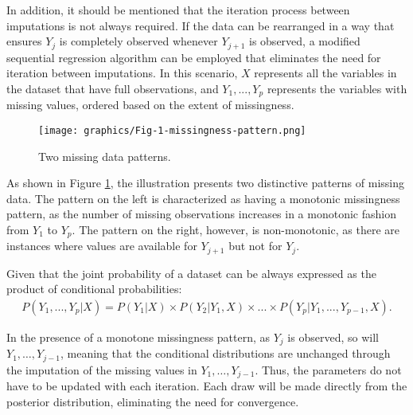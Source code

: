 In addition, it should be mentioned that the iteration process between imputations is not always required. If the data can be rearranged in a way that ensures $Y_j$ is completely observed whenever $Y_{j+1}$ is observed, a modified sequential regression algorithm can be employed that eliminates the need for iteration between imputations. In this scenario, $X$ represents all the variables in the dataset that have full observations, and $Y_1,...,Y_p$ represents the variables with missing values, ordered based on the extent of missingness. 
\begin{figure}[H]
    \centering
    \texttt{[image: graphics/Fig-1-missingness-pattern.png]}    
    \caption{Two missing data patterns.}
    \label{fig:missingpatterns}
\end{figure}

As shown in Figure \ref{fig:missingpatterns}, the illustration presents two distinctive patterns of missing data. The pattern on the left is characterized as having a monotonic missingness pattern, as the number of missing observations increases in a monotonic fashion from $Y_1$ to $Y_p$. The pattern on the right, however, is non-monotonic, as there are instances where values are available for $Y_{j+1}$ but not for $Y_j$.

Given that the joint probability of a dataset can be always expressed as the product of conditional probabilities:
\begin{align}
\label{equ:jointdis}
  P(Y_1,...,Y_p|X)=P(Y_1|X)\times P(Y_2|Y_1,X)\times ... \times P(Y_p|Y_1,...,Y_{p-1},X).
\end{align}

In the presence of a monotone missingness pattern, as $Y_j$ is observed, so will $Y_1,\ldots,Y_{j-1}$, meaning that the conditional distributions are unchanged through the imputation of the missing values in $Y_1,\ldots,Y_{j-1}$. Thus, the parameters do not have to be updated with each iteration. Each draw will be made directly from the posterior distribution, eliminating the need for convergence.

